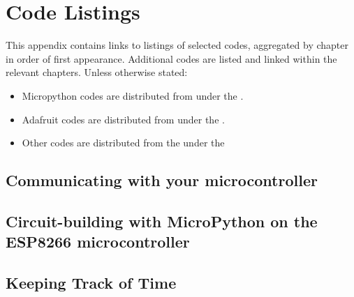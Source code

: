 \setchapterpreamble[u]{\margintoc}
\chapter{Code Listings}

This appendix contains links to listings of selected codes, aggregated by chapter in order of first appearance. Additional codes are listed and linked within the relevant chapters. Unless otherwise stated:
\begin{itemize}
	\item Micropython codes are distributed from  under the .
	\item Adafruit codes are distributed from  under the .
	\item Other codes are distributed from the  under the 
\end{itemize}


\section{Communicating with your microcontroller}

\section{Circuit-building with MicroPython on the ESP8266 microcontroller}


\section{Keeping Track of Time}

%

